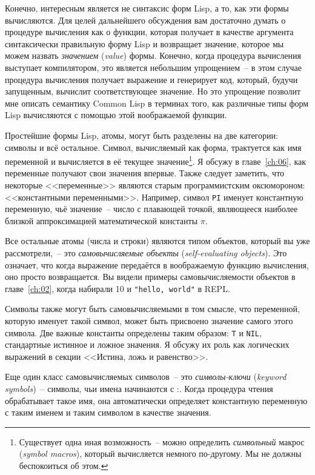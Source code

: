 Конечно, интересным является не синтаксис форм Lisp, а то, как эти формы вычисляются. Для
целей дальнейшего обсуждения вам достаточно думать о процедуре вычисления как о функции,
которая получает в качестве аргумента синтаксически правильную форму Lisp и возвращает
значение, которое мы можем назвать \textit{значением} (\textit{value}) формы. Конечно,
когда процедура вычисления выступает компилятором, это является небольшим упрощением~-- в
этом случае процедура вычисления получает выражение и генерирует код, который, будучи
запущенным, вычислит соответствующее значение. Но это упрощение позволит мне описать
семантику Common Lisp в терминах того, как различные типы форм Lisp вычисляются с помощью
этой воображаемой функции.

Простейшие формы Lisp, атомы, могут быть разделены на две категории: символы и всё
остальное. Символ, вычисляемый как форма, трактуется как имя переменной и вычисляется в её
текущее значение\footnote{Существует одна иная возможность~-- можно определить
  \textit{символьный} макрос (\textit{symbol macros}), который вычисляется немного
  по-другому.  Мы не должны беспокоиться об этом.}. Я обсужу в главе~\ref{ch:06}, как
переменные получают свои значения впервые. Также следует заметить, что некоторые
<<переменные>> являются старым программистским оксюмороном: <<константными
переменными>>. Например, символ \lstinline{PI} именует константную переменную, чьё
значение~-- число с плавающей точкой, являющееся наиболее близкой аппроксимацией
математической константы $\pi$.

Все остальные атомы (числа и строки) являются типом объектов, который вы уже
рассмотрели,~-- это \textit{самовычисляемые объекты} (\textit{self-evaluating
  objects}). Это означает, что когда выражение передаётся в воображаемую функцию
вычисления, оно просто возвращается. Вы видели примеры самовычисляемости объектов в
главе~\ref{ch:02}, когда набирали 10 и \lstinline{"hello, world"} в REPL.

Символы также могут быть самовычисляемыми в том смысле, что переменной, которую именует
такой символ, может быть присвоено значение самого этого символа. Две важные константы
определены таким образом: \lstinline{T} и \lstinline{NIL}, стандартные истинное и ложное
значения. Я обсужу их роль как логических выражений в секции <<Истина, ложь и равенство>>.

Еще один класс самовычисляемых символов~-- это \textit{символы-ключи} (\textit{keyword
  symbols})~-- символы, чьи имена начинаются с :. Когда процедура чтения обрабатывает
такое имя, она автоматически определяет константную переменную с таким именем и таким
символом в качестве значения.

